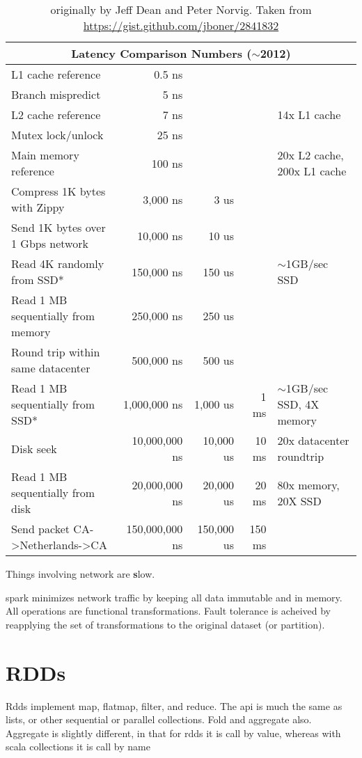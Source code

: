 \begin{table}[hbp]
\small
\begin{tabular}{l r r r l}
\multicolumn{5}{c}{Latency Comparison Numbers ($\sim$2012)} \\
\hline\hline
L1 cache reference                 &          0.5 ns &             &         &  \\
Branch mispredict                  &          5   ns &             &         &  \\
L2 cache reference                 &          7   ns &             &         & 14x L1 cache \\
Mutex lock/unlock                  &         25   ns &             &         &  \\
Main memory reference              &        100   ns &             &         & 20x L2 cache, 200x L1 cache \\
Compress 1K bytes with Zippy       &      3,000   ns &        3 us &         & \\
Send 1K bytes over 1 Gbps network  &     10,000   ns &       10 us &         & \\
Read 4K randomly from SSD*         &    150,000   ns &      150 us &         & $\sim$1GB/sec SSD \\
Read 1 MB sequentially from memory &    250,000   ns &      250 us &         & \\
Round trip within same datacenter  &    500,000   ns &      500 us &         & \\
Read 1 MB sequentially from SSD*   &  1,000,000   ns &    1,000 us &    1 ms &  $\sim$1GB/sec SSD, 4X memory \\
Disk seek                          & 10,000,000   ns &   10,000 us &   10 ms &  20x datacenter roundtrip \\
Read 1 MB sequentially from disk   & 20,000,000   ns &   20,000 us &   20 ms &  80x memory, 20X SSD \\
Send packet CA->Netherlands->CA    &150,000,000   ns &  150,000 us &  150 ms &  \\

\end{tabular}
\caption{originally by Jeff Dean and Peter Norvig. Taken from \hyperref[here]{https://gist.github.com/jboner/2841832}}
\end{table}

Things involving network are {\textbf slow}. 

spark minimizes network traffic by keeping all data immutable and in memory. All operations are functional transformations. Fault tolerance is acheived by reapplying the set of transformations to the original dataset (or partition).

\section{RDDs}

Rdds implement map, flatmap, filter, and reduce. The api is much the same as lists, or other sequential or parallel collections. Fold and aggregate also. Aggregate is slightly different, in that for rdds it is call by value, whereas with scala collections it is call by name 

